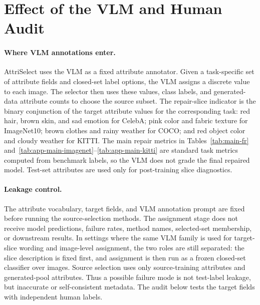 \documentclass{article}
\newcommand{\model}{AttriSelect\xspace}
\begin{document}
\section{Effect of the VLM and Human Audit}
\label{app:vlm-human-audit}

\paragraph{Where VLM annotations enter.}
\model uses the VLM as a fixed attribute annotator. Given a task-specific set of attribute fields and closed-set label options, the VLM assigns a discrete value to each image. The selector then uses these values, class labels, and generated-data attribute counts to choose the source subset. The repair-slice indicator is the binary conjunction of the target attribute values for the corresponding task: red hair, brown skin, and sad emotion for CelebA; pink color and fabric texture for ImageNet10; brown clothes and rainy weather for COCO; and red object color and cloudy weather for KITTI. The main repair metrics in Tables~\ref{tab:main-fr} and~\ref{tab:app-main-imagenet}--\ref{tab:app-main-kitti} are standard task metrics computed from benchmark labels, so the VLM does not grade the final repaired model. Test-set attributes are used only for post-training slice diagnostics.

\paragraph{Leakage control.}
The attribute vocabulary, target fields, and VLM annotation prompt are fixed before running the source-selection methods. The assignment stage does not receive model predictions, failure rates, method names, selected-set membership, or downstream results. In settings where the same VLM family is used for target-slice wording and image-level assignment, the two roles are still separated: the slice description is fixed first, and assignment is then run as a frozen closed-set classifier over images. Source selection uses only source-training attributes and generated-pool attributes. Thus a possible failure mode is not test-label leakage, but inaccurate or self-consistent metadata. The audit below tests the target fields with independent human labels.
\end{document}
